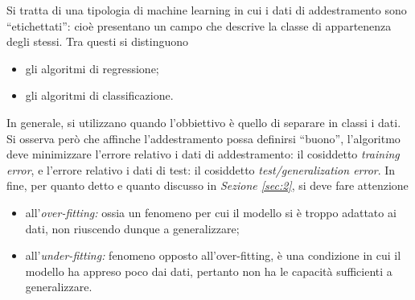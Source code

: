 \documentclass{subfiles}
\begin{document}
Si tratta di una tipologia di machine learning in cui i dati di addestramento sono ``etichettati'':
cioè presentano un campo che descrive la classe di appartenenza degli stessi.
Tra questi si distinguono
\begin{itemize}
    \item gli algoritmi di regressione;
    \item gli algoritmi di classificazione.
\end{itemize}
In generale, si utilizzano quando l'obbiettivo è quello di separare in classi i dati.
Si osserva però che affinche l'addestramento possa definirsi ``buono'', l'algoritmo deve minimizzare l'errore relativo i dati di addestramento:
il cosiddetto \emph{training error}, e l'errore relativo i dati di test: il cosiddetto \emph{test/generalization error}.
In fine, per quanto detto e quanto discusso in \emph{Sezione \ref{sec:2}}, si deve fare attenzione
\begin{itemize}
    \item all'\emph{over-fitting:} ossia un fenomeno per cui il modello si è troppo adattato ai dati, non riuscendo dunque a generalizzare;
    \item all'\emph{under-fitting:} fenomeno opposto all'over-fitting, è una condizione in cui il modello ha appreso poco dai dati,
          pertanto non ha le capacità sufficienti a generalizzare.
\end{itemize}
\end{document}

